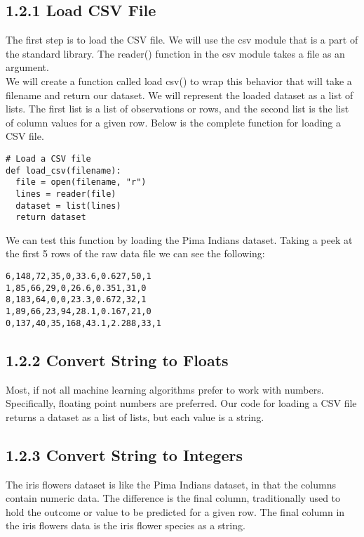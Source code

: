 \documentclass[12pt]{article}
\begin{document}
\subsection*{1.2.1 Load CSV File}
The first step is to load the CSV file. We will use the csv module that is a part of the standard library. The reader() function in the csv module takes a file as an argument.\\
We will create a function called load csv() to wrap this behavior that will take a filename and return our dataset. We will represent the loaded dataset as a list of lists. The first list is a list of observations or rows, and the second list is the list of column values for a given row. Below is the complete function for loading a CSV file.
\begin{verbatim}
# Load a CSV file
def load_csv(filename):
  file = open(filename, "r")
  lines = reader(file)
  dataset = list(lines)
  return dataset
\end{verbatim}
We can test this function by loading the Pima Indians dataset. Taking a peek at the first 5 rows of the raw data file we can see the following:
\begin{verbatim}
6,148,72,35,0,33.6,0.627,50,1
1,85,66,29,0,26.6,0.351,31,0
8,183,64,0,0,23.3,0.672,32,1
1,89,66,23,94,28.1,0.167,21,0
0,137,40,35,168,43.1,2.288,33,1
\end{verbatim}

\subsection*{1.2.2 Convert String to Floats}
Most, if not all machine learning algorithms prefer to work with numbers. Specifically, floating point numbers are preferred. Our code for loading a CSV file returns a dataset as a list of lists, but each value is a string.
\subsection*{1.2.3 Convert String to Integers}
The iris flowers dataset is like the Pima Indians dataset, in that the columns contain numeric data. The difference is the final column, traditionally used to hold the outcome or value to be predicted for a given row. The final column in the iris flowers data is the iris flower species as a string.
\end{document}
